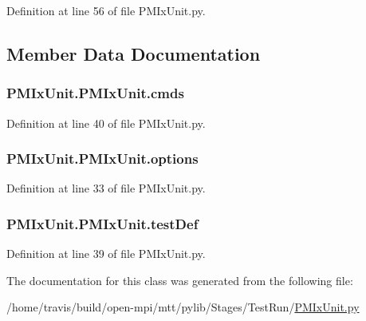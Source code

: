 Definition at line 56 of file P\-M\-Ix\-Unit.\-py.



\subsection{Member Data Documentation}
\hypertarget{class_p_m_ix_unit_1_1_p_m_ix_unit_a1130f07074aeff223235a147440868c4}{
\subsubsection[{cmds}]{\setlength{\rightskip}{0pt plus 5cm}P\-M\-Ix\-Unit.\-P\-M\-Ix\-Unit.\-cmds}}\label{class_p_m_ix_unit_1_1_p_m_ix_unit_a1130f07074aeff223235a147440868c4}


Definition at line 40 of file P\-M\-Ix\-Unit.\-py.

\hypertarget{class_p_m_ix_unit_1_1_p_m_ix_unit_a6c56979e7226a414874653b3e7a17dd8}{
\subsubsection[{options}]{\setlength{\rightskip}{0pt plus 5cm}P\-M\-Ix\-Unit.\-P\-M\-Ix\-Unit.\-options}}\label{class_p_m_ix_unit_1_1_p_m_ix_unit_a6c56979e7226a414874653b3e7a17dd8}


Definition at line 33 of file P\-M\-Ix\-Unit.\-py.

\hypertarget{class_p_m_ix_unit_1_1_p_m_ix_unit_a08b01eaf2867a0a02f8598018739e843}{
\subsubsection[{test\-Def}]{\setlength{\rightskip}{0pt plus 5cm}P\-M\-Ix\-Unit.\-P\-M\-Ix\-Unit.\-test\-Def}}\label{class_p_m_ix_unit_1_1_p_m_ix_unit_a08b01eaf2867a0a02f8598018739e843}


Definition at line 39 of file P\-M\-Ix\-Unit.\-py.



The documentation for this class was generated from the following file\-:\begin{DoxyCompactItemize}
\item 
/home/travis/build/open-\/mpi/mtt/pylib/\-Stages/\-Test\-Run/\hyperlink{_p_m_ix_unit_8py}{P\-M\-Ix\-Unit.\-py}\end{DoxyCompactItemize}
